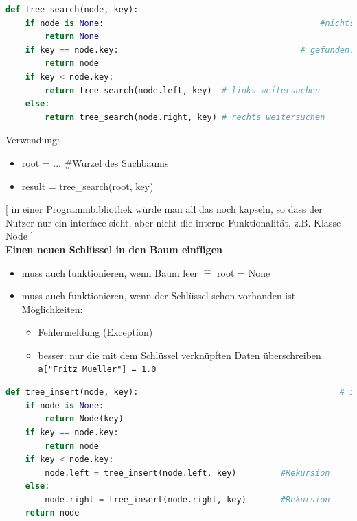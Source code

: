 \documentclass[11pt, fleqn]{scrreprt}
\begin{document}
\begin{lstlisting}[language=Python]
def tree_search(node, key):
	if node is None: 											#nichts gefunden, Rekursionsabschluss 1
		return None
	if key == node.key:										# gefunden! Rekursionsabschluss 2
		return node
	if key < node.key:				
		return tree_search(node.left, key)	# links weitersuchen
	else:
		return tree_search(node.right, key) # rechts weitersuchen
\end{lstlisting}

Verwendung:
\begin{itemize}[label ={}]
	\item root = ... 	\hspace*{1cm} \#Wurzel des Suchbaums
	\item result = tree\_search(root, key)
\end{itemize}
$[$ in einer Programmbibliothek würde man all das noch \glqq kapseln\grqq , so dass der Nutzer nur ein interface sieht, aber nicht die interne Funktionalität, z.B. Klasse Node $]$ \\

\textbf{Einen neuen Schlüssel in den Baum einfügen}
\begin{itemize}
	\item muss auch funktionieren, wenn Baum leer $\widehat{=}$ root = None
	\item muss auch funktionieren, wenn der Schlüssel schon vorhanden ist \\
	Möglichkeiten:
	\begin{itemize}
		\item Fehlermeldung (Exception)
		\item besser: nur die mit dem Schlüssel verknüpften Daten überschreiben \verb|a["Fritz Mueller"] = 1.0|
	\end{itemize}
\end{itemize}

\begin{lstlisting}[language=Python]
def tree_insert(node, key):											# in der Praxis: ,data)
	if node is None:															# richtigen Platz gefunden
		return Node(key)													  # Konstruktor
	if key == node.key:														# Schluessel schon vorhanden
		return node																	# in Praxis: Daten ersetzen vorher
	if key < node.key:														# key gehoert in den linken Teilbaum
		node.left = tree_insert(node.left, key)			#Rekursion
	else:
		node.right = tree_insert(node.right, key)		#Rekursion
	return node
\end{lstlisting}
\end{document}
